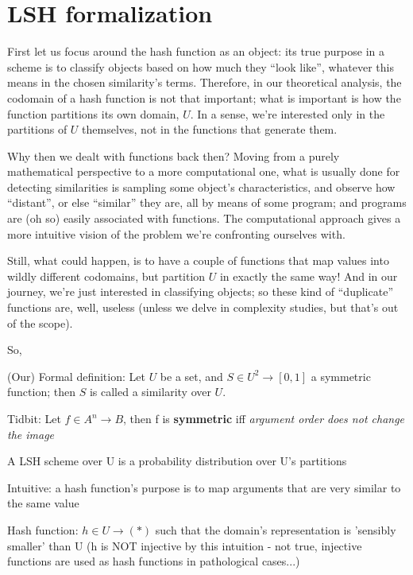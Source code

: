 \documentclass{report}
\begin{document}
	
\section{LSH formalization}

    First let us focus around the hash function as an object: its true purpose in a scheme is to classify objects based on how much they ``look like'', whatever this means in the chosen similarity's terms. Therefore, in our theoretical analysis, the codomain of a hash function is not that important; what is important is how the function partitions its own domain, $U$. In a sense, we're interested only in the partitions of $U$ themselves, not in the functions that generate them.
    
    Why then we dealt with functions back then? Moving from a purely mathematical perspective to a more computational one, what is usually done for detecting similarities is sampling some object's characteristics, and observe how ``distant'', or else ``similar'' they are, all by means of some program; and programs are (oh so) easily associated with functions. The computational approach gives a more intuitive vision of the problem we're confronting ourselves with.
    
    Still, what could happen, is to have a couple of functions that map values into wildly different codomains, but partition $U$ in exactly the same way! And in our journey, we're just interested in classifying objects; so these kind of ``duplicate'' functions are, well, useless (unless we delve in complexity studies, but that's out of the scope).
    
    So, 

    (Our) Formal definition: Let $U$ be a set, and $S \in U^2 \to [0, 1]$ a symmetric function; then $S$ is called a similarity over $U$.
	
	Tidbit: Let $f \in A^n \to B$, then f is \textbf{symmetric} iff \textit{argument order does not change the image} %
	
	A LSH scheme over U is a probability distribution over U's partitions
	
	
	Intuitive: a hash function's purpose is to map arguments that are very similar to the same value
	
	Hash function: $h \in U \to (*)$ such that the domain's representation is 'sensibly smaller' than U (h is NOT injective by this intuition - not true, injective functions are used as hash functions in pathological cases...)
	
\end{document}
